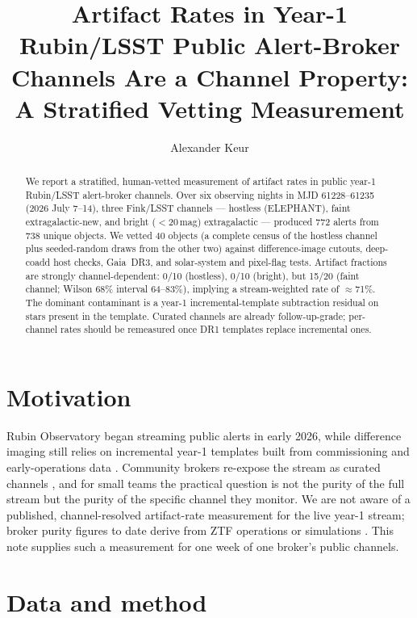 \documentclass[RNAAS]{aastex701}
\begin{document}
\title{Artifact Rates in Year-1 Rubin/LSST Public Alert-Broker Channels Are a Channel Property: A Stratified Vetting Measurement}

\author[0000-0000-0000-0000]{Alexander Keur}

\begin{abstract}
We report a stratified, human-vetted measurement of artifact rates in public
year-1 Rubin/LSST alert-broker channels. Over six observing nights in
MJD 61228--61235 (2026 July 7--14), three Fink/LSST channels --- hostless
(ELEPHANT), faint extragalactic-new, and bright ($<$20\,mag) extragalactic ---
produced 772 alerts from 738 unique objects. We vetted 40 objects (a complete
census of the hostless channel plus seeded-random draws from the other two)
against difference-image cutouts, deep-coadd host checks, Gaia~DR3, and
solar-system and pixel-flag tests. Artifact fractions are strongly
channel-dependent: 0/10 (hostless), 0/10 (bright), but 15/20 (faint channel;
Wilson 68\% interval 64--83\%), implying a stream-weighted rate of
$\approx$71\%. The dominant contaminant is a year-1 incremental-template
subtraction residual on stars present in the template. Curated channels are
already follow-up-grade; per-channel rates should be remeasured once DR1
templates replace incremental ones.
\end{abstract}

\section{Motivation}

Rubin Observatory began streaming public alerts in early 2026, while
difference imaging still relies on incremental year-1 templates built from
commissioning and early-operations data \citep{Robinson2024}. Community
brokers re-expose the stream as curated channels
\citep[e.g., Fink;][]{Moller2021}, and for small teams the practical question
is not the purity of the full stream but the purity of the specific channel
they monitor. We are not aware of a published, channel-resolved artifact-rate
measurement for the live year-1 stream; broker purity figures to date derive
from ZTF operations or simulations \citep[e.g.,][]{Pessi2024, Durgesh2026,
CarrascoDavis2021}. This note supplies such a measurement for one week of one
broker's public channels.

\section{Data and method}
\end{document}
